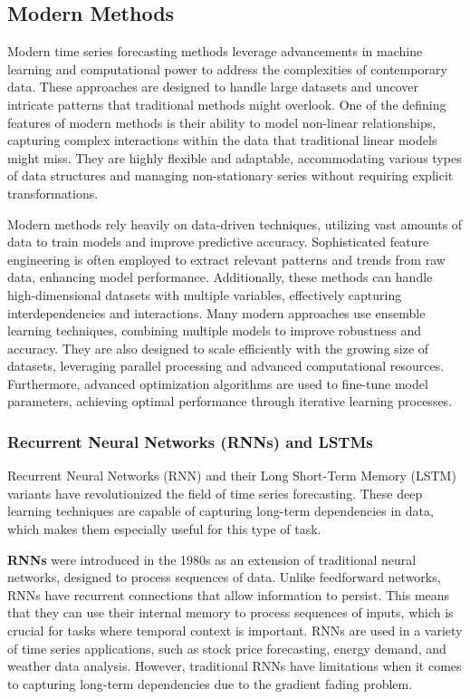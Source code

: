 \subsection{Modern Methods}

Modern time series forecasting methods leverage advancements in machine learning and computational power to address the complexities of contemporary data. These approaches are designed to handle large datasets and uncover intricate patterns that traditional methods might overlook. One of the defining features of modern methods is their ability to model non-linear relationships, capturing complex interactions within the data that traditional linear models might miss. They are highly flexible and adaptable, accommodating various types of data structures and managing non-stationary series without requiring explicit transformations.

Modern methods rely heavily on data-driven techniques, utilizing vast amounts of data to train models and improve predictive accuracy. Sophisticated feature engineering is often employed to extract relevant patterns and trends from raw data, enhancing model performance. Additionally, these methods can handle high-dimensional datasets with multiple variables, effectively capturing interdependencies and interactions. Many modern approaches use ensemble learning techniques, combining multiple models to improve robustness and accuracy. They are also designed to scale efficiently with the growing size of datasets, leveraging parallel processing and advanced computational resources. Furthermore, advanced optimization algorithms are used to fine-tune model parameters, achieving optimal performance through iterative learning processes.
\vspace{10pt}


\subsubsection{Recurrent Neural Networks (RNNs) and LSTMs}
Recurrent Neural Networks (RNN) and their Long Short-Term Memory (LSTM) variants have revolutionized the field of time series forecasting. These deep learning techniques are capable of capturing long-term dependencies in data, which makes them especially useful for this type of task.
\vspace{10pt}

\textbf{RNNs} were introduced in the 1980s as an extension of traditional neural networks, designed to process sequences of data. Unlike feedforward networks, RNNs have recurrent connections that allow information to persist. This means that they can use their internal memory to process sequences of inputs, which is crucial for tasks where temporal context is important.
RNNs are used in a variety of time series applications, such as stock price forecasting, energy demand, and weather data analysis. However, traditional RNNs have limitations when it comes to capturing long-term dependencies due to the gradient fading problem.
\vspace{10pt}

